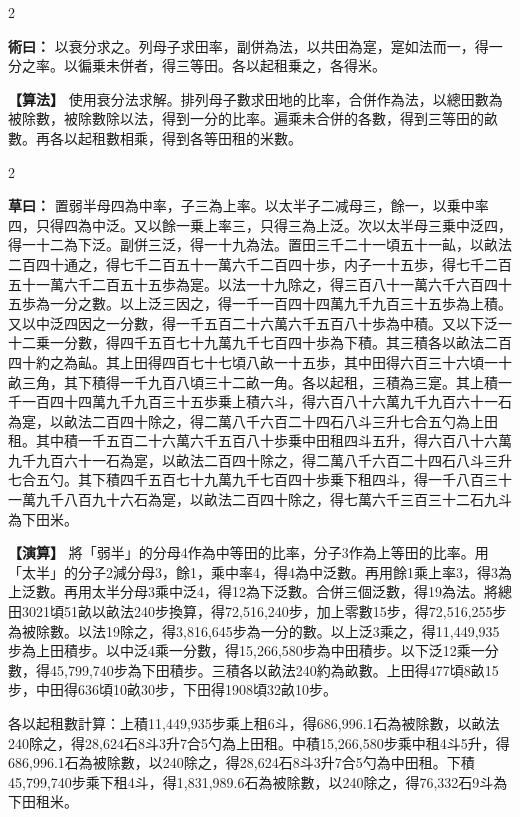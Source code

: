 \documentclass[11pt,a4paper]{article}
\newcommand{\ClassicalMethod}[1]{\par\noindent\textbf{\color{methodcolor}術曰：}#1\par}
\newcommand{\ClassicalWorking}[1]{\par\noindent\textbf{草曰：}#1\par}
\newcommand{\ModernMethod}[1]{\par\noindent\textbf{\color{methodcolor}【算法】}#1\par}
\newcommand{\ModernWorking}[1]{\par\noindent\textbf{【演算】}#1\par}
\begin{document}
\begin{paracol}{2}

\ClassicalMethod{%
以衰分求之。列母子求田率，副併為法，以共田為寔，寔如法而一，得一分之率。以徧乗未併者，得三等田。各以起租乗之，各得米。}

\switchcolumn

\ModernMethod{%
使用衰分法求解。排列母子數求田地的比率，合併作為法，以總田數為被除數，被除數除以法，得到一分的比率。遍乘未合併的各數，得到三等田的畝數。再各以起租數相乘，得到各等田租的米數。
}

\end{paracol}

\begin{paracol}{2}

\ClassicalWorking{%
置弱半母四為中率，子三為上率。以太半子二减母三，餘一，以乗中率四，只得四為中泛。又以餘一乗上率三，只得三為上泛。次以太半母三乗中泛四，得一十二為下泛。副併三泛，得一十九為法。置田三千二十一頃五十一畆，以畝法二百四十通之，得七千二百五十一萬六千二百四十歩，内子一十五歩，得七千二百五十一萬六千二百五十五歩為寔。以法一十九除之，得三百八十一萬六千六百四十五歩為一分之數。以上泛三因之，得一千一百四十四萬九千九百三十五歩為上積。又以中泛四因之一分數，得一千五百二十六萬六千五百八十歩為中積。又以下泛一十二乗一分數，得四千五百七十九萬九千七百四十歩為下積。其三積各以畝法二百四十約之為畆。其上田得四百七十七頃八畝一十五歩，其中田得六百三十六頃一十畝三角，其下積得一千九百八頃三十二畝一角。各以起租，三積為三寔。其上積一千一百四十四萬九千九百三十五歩乗上積六斗，得六百八十六萬九千九百六十一石為寔，以畝法二百四十除之，得二萬八千六百二十四石八斗三升七合五勺為上田租。其中積一千五百二十六萬六千五百八十歩乗中田租四斗五升，得六百八十六萬九千九百六十一石為寔，以畝法二百四十除之，得二萬八千六百二十四石八斗三升七合五勺。其下積四千五百七十九萬九千七百四十歩乗下租四斗，得一千八百三十一萬九千八百九十六石為寔，以畝法二百四十除之，得七萬六千三百三十二石九斗為下田米。}

\switchcolumn

\ModernWorking{%
將「弱半」的分母4作為中等田的比率，分子3作為上等田的比率。用「太半」的分子2減分母3，餘1，乘中率4，得4為中泛數。再用餘1乘上率3，得3為上泛數。再用太半分母3乘中泛4，得12為下泛數。合併三個泛數，得19為法。將總田3021頃51畝以畝法240步換算，得72,516,240步，加上零數15步，得72,516,255步為被除數。以法19除之，得3,816,645步為一分的數。以上泛3乘之，得11,449,935步為上田積步。以中泛4乘一分數，得15,266,580步為中田積步。以下泛12乘一分數，得45,799,740步為下田積步。三積各以畝法240約為畝數。上田得477頃8畝15步，中田得636頃10畝30步，下田得1908頃32畝10步。

各以起租數計算：上積11,449,935步乘上租6斗，得686,996.1石為被除數，以畝法240除之，得28,624石8斗3升7合5勺為上田租。中積15,266,580步乘中租4斗5升，得686,996.1石為被除數，以240除之，得28,624石8斗3升7合5勺為中田租。下積45,799,740步乘下租4斗，得1,831,989.6石為被除數，以240除之，得76,332石9斗為下田租米。
}

\end{paracol}
\end{document}

